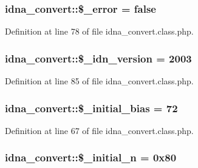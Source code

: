 \subsubsection[{\$\+\_\+error}]{\setlength{\rightskip}{0pt plus 5cm}idna\+\_\+convert\+::\$\+\_\+error = false\hspace{0.3cm}{\ttfamily [protected]}}\label{classidna__convert_ae3825ac4f637ed992ef96f261647c396}


Definition at line 78 of file idna\+\_\+convert.\+class.\+php.

\hypertarget{classidna__convert_a14edc7c94d7c9c05a8a7eada24901dfd}{}
\subsubsection[{\$\+\_\+idn\+\_\+version}]{\setlength{\rightskip}{0pt plus 5cm}idna\+\_\+convert\+::\$\+\_\+idn\+\_\+version = 2003\hspace{0.3cm}{\ttfamily [protected]}}\label{classidna__convert_a14edc7c94d7c9c05a8a7eada24901dfd}


Definition at line 85 of file idna\+\_\+convert.\+class.\+php.

\hypertarget{classidna__convert_a9baf9ea9ebceee6e4dffb60cce1d20bc}{}
\subsubsection[{\$\+\_\+initial\+\_\+bias}]{\setlength{\rightskip}{0pt plus 5cm}idna\+\_\+convert\+::\$\+\_\+initial\+\_\+bias = 72\hspace{0.3cm}{\ttfamily [protected]}}\label{classidna__convert_a9baf9ea9ebceee6e4dffb60cce1d20bc}


Definition at line 67 of file idna\+\_\+convert.\+class.\+php.

\hypertarget{classidna__convert_a02dd88f575541a67a6312a15af340733}{}
\subsubsection[{\$\+\_\+initial\+\_\+n}]{\setlength{\rightskip}{0pt plus 5cm}idna\+\_\+convert\+::\$\+\_\+initial\+\_\+n = 0x80\hspace{0.3cm}{\ttfamily [protected]}}\label{classidna__convert_a02dd88f575541a67a6312a15af340733}


